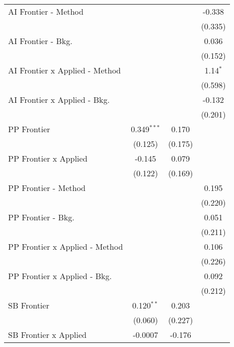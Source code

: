 \begin{tabular}{lccc}
   AI Frontier - Method           &               &             & -0.338\\   
                                  &               &             & (0.335)\\   
   AI Frontier - Bkg.             &               &             & 0.036\\   
                                  &               &             & (0.152)\\   
   AI Frontier x Applied - Method &               &             & 1.14$^{*}$\\   
                                  &               &             & (0.598)\\   
   AI Frontier x Applied - Bkg.   &               &             & -0.132\\   
                                  &               &             & (0.201)\\   
   PP Frontier                    & 0.349$^{***}$ & 0.170       &   \\   
                                  & (0.125)       & (0.175)     &   \\   
   PP Frontier x Applied          & -0.145        & 0.079       &   \\   
                                  & (0.122)       & (0.169)     &   \\   
   PP Frontier - Method           &               &             & 0.195\\   
                                  &               &             & (0.220)\\   
   PP Frontier - Bkg.             &               &             & 0.051\\   
                                  &               &             & (0.211)\\   
   PP Frontier x Applied - Method &               &             & 0.106\\   
                                  &               &             & (0.226)\\   
   PP Frontier x Applied - Bkg.   &               &             & 0.092\\   
                                  &               &             & (0.212)\\   
   SB Frontier                    & 0.120$^{**}$  & 0.203       &   \\   
                                  & (0.060)       & (0.227)     &   \\   
   SB Frontier x Applied          & -0.0007       & -0.176      &   \\   

\end{tabular}

